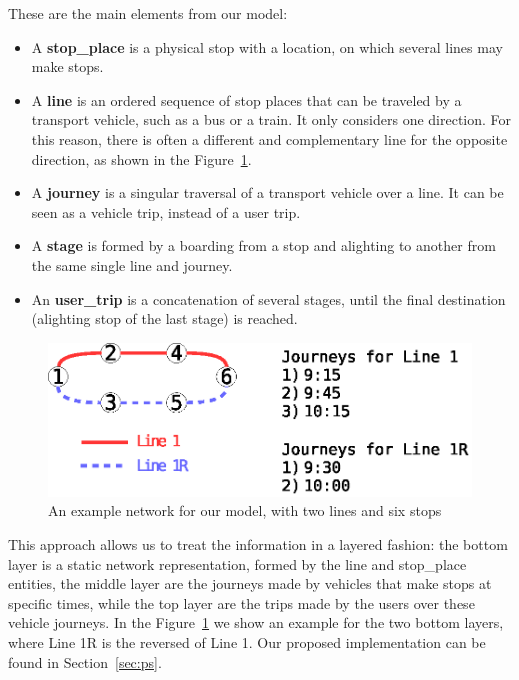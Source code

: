 \documentclass[runningheads]{llncs}
\begin{document}
These are the main elements from our model:
\begin{itemize}
    \item A \textbf{stop\_place} is a physical stop with a location, on which several lines may make stops.
    \item A \textbf{line} is an ordered sequence of stop places that can be traveled by a transport vehicle, such as a bus or a train. It only considers one direction. For this reason, there is often a different and complementary line for the opposite direction, as shown in the Figure~\ref{fig:example_network}.
    \item A \textbf{journey} is a singular traversal of a transport vehicle over a line. It can be seen as a vehicle trip, instead of a user trip.
    \item A \textbf{stage} is formed by a boarding from a stop and alighting to another from the same single line and journey.
    \item An \textbf{user\_trip} is a concatenation of several stages, until the final destination (alighting stop of the last stage) is reached.
\end{itemize}

\begin{figure}
\includegraphics[width=\textwidth]{example_network.eps}
\caption{An example network for our model, with two lines and six stops}
\label{fig:example_network}
\end{figure}

This approach allows us to treat the information in a layered fashion: the bottom layer is a static network representation, formed by the line and stop\_place entities, the middle layer are the journeys made by vehicles that make stops at specific times, while the top layer are the trips made by the users over these vehicle journeys. In the Figure~\ref{fig:example_network} we show an example for the two bottom layers, where Line 1R is the reversed of Line 1. Our proposed implementation can be found in Section~\ref{sec:ps}.
\end{document}
